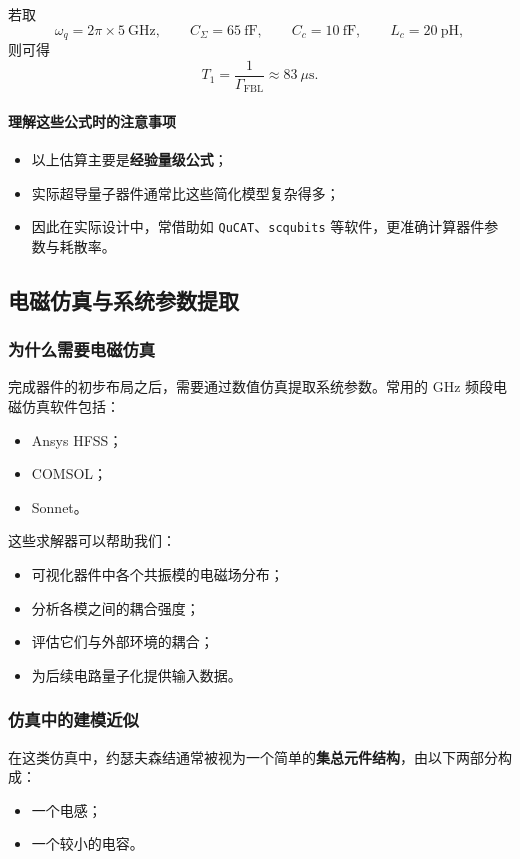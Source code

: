 \documentclass[12pt,a4paper,oneside]{ctexbook}
\begin{document}
若取
\[
\omega_q = 2\pi\times 5~\mathrm{GHz},\qquad
C_{\Sigma}=65~\mathrm{fF},\qquad
C_c=10~\mathrm{fF},\qquad
L_c=20~\mathrm{pH},
\]
则可得
\[
T_1 = \frac{1}{\Gamma_{\mathrm{FBL}}} \approx 83~\mu\mathrm{s}.
\]

\paragraph{理解这些公式时的注意事项}
\begin{itemize}
    \item 以上估算主要是\textbf{经验量级公式}；
    \item 实际超导量子器件通常比这些简化模型复杂得多；
    \item 因此在实际设计中，常借助如 \texttt{QuCAT}、\texttt{scqubits} 等软件，更准确计算器件参数与耗散率。
\end{itemize}

\subsection{电磁仿真与系统参数提取}

\subsubsection{为什么需要电磁仿真}

完成器件的初步布局之后，需要通过数值仿真提取系统参数。常用的 GHz 频段电磁仿真软件包括：
\begin{itemize}
    \item Ansys HFSS；
    \item COMSOL；
    \item Sonnet。
\end{itemize}

这些求解器可以帮助我们：
\begin{itemize}
    \item 可视化器件中各个共振模的电磁场分布；
    \item 分析各模之间的耦合强度；
    \item 评估它们与外部环境的耦合；
    \item 为后续电路量子化提供输入数据。
\end{itemize}

\subsubsection{仿真中的建模近似}

在这类仿真中，约瑟夫森结通常被视为一个简单的\textbf{集总元件结构}，由以下两部分构成：
\begin{itemize}
    \item 一个电感；
    \item 一个较小的电容。
\end{itemize}
\end{document}
